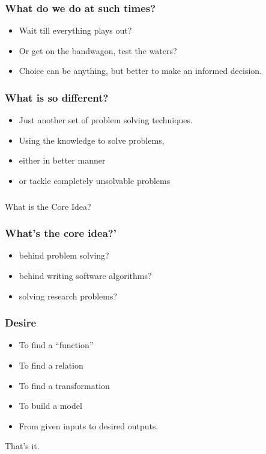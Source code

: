 \begin{frame}[fragile]\frametitle{What do we do at such times?}
\begin{itemize}
\item Wait till everything plays out?
\item Or get on the bandwagon, test the waters?
\item Choice can be anything, but better to make an informed decision.
\end{itemize}
\end{frame}

\begin{frame}[fragile]\frametitle{What is so different?}
\begin{itemize}
\item Just another set of problem solving techniques.
\item Using the knowledge to solve problems, 
\item either in better manner
\item or tackle completely unsolvable problems 
\end{itemize}
\end{frame}

\begin{frame}[fragile]\frametitle{}
\begin{center}
{\Large What is the Core Idea?}
\end{center}
\end{frame}

\begin{frame}[fragile]\frametitle{What's the core idea?'}
\begin{itemize}
\item behind problem solving?
\item behind writing software algorithms?
\item solving research problems?
\end{itemize}
\end{frame}

\begin{frame}[fragile]\frametitle{Desire}
\begin{itemize}
\item To find a ``function''
\item To find a relation
\item To find a transformation
\item To build a model
\item From given inputs to desired outputs.
\end{itemize}
That's it.
\end{frame}

